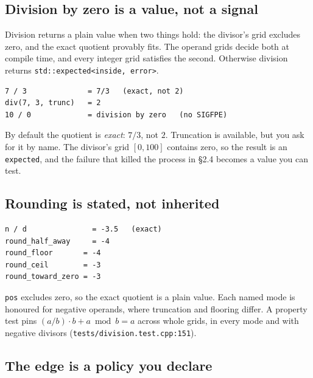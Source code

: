 \documentclass[11pt,a4paper]{article}
\newcommand{\code}[1]{\texttt{\small #1}}
\newcommand{\file}[1]{\texttt{\small #1}}
\begin{document}
\subsection{Division by zero is a value, not a signal}\label{sec:divzero}

Division returns a plain value when two things hold: the divisor's grid
excludes zero, and the exact quotient provably fits. The operand grids decide
both at compile time, and every integer grid satisfies the second. Otherwise
division returns \code{std::expected<inside, error>}.


\begin{lstlisting}[style=term]
7 / 3              = 7/3   (exact, not 2)
div(7, 3, trunc)   = 2
10 / 0             = division by zero   (no SIGFPE)
\end{lstlisting}

\noindent
By default the quotient is \emph{exact}: $7/3$, not $2$. Truncation is
available, but you ask for it by name. The divisor's grid $[0,100]$ contains
zero, so the result is an \code{expected}, and the failure that killed the
process in \S2.4 becomes a value you can test.

\subsection{Rounding is stated, not inherited}


\begin{lstlisting}[style=term]
n / d               = -3.5   (exact)
round_half_away     = -4
round_floor       = -4
round_ceil        = -3
round_toward_zero = -3
\end{lstlisting}

\begin{sloppypar}
\noindent
\code{pos} excludes zero, so the exact quotient is a plain value. Each named
mode is honoured for negative operands, where truncation and flooring differ.
A property test pins $(a/b) \cdot b + a \bmod b = a$ across whole grids, in
every mode and with negative divisors
(\file{tests/division.test.cpp:151}).
\end{sloppypar}

\subsection{The edge is a policy you declare}
\end{document}

